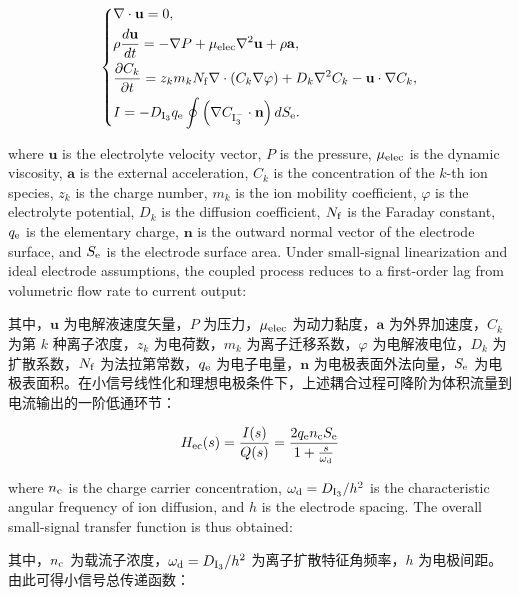 \documentclass[sn-nature]{sn-jnl}
\newif\ifCNENEnglish
\newif\ifCNENBilingual
\newcommand{\CNEN}[2]{%
    \ifCNENBilingual
        #1%
        \if\relax\detokenize{#2}\relax\else\par #2\fi%
    \else
        \ifCNENEnglish
            #2%
        \else
            #1%
        \fi
    \fi
}
\begin{document}
\begin{equation}
    \left\{
    \begin{aligned}
         & \nabla \cdot \mathbf{u} = 0, \\
         & \rho \frac{d\mathbf{u}}{dt} = -\nabla P + \mu_{\rm elec}\nabla^2\mathbf{u} + \rho \mathbf{a}, \\
         & \frac{\partial C_k}{\partial t} =
         z_k m_k N_{\rm f} \nabla \cdot \left(C_k \nabla \varphi\right)
         + D_k \nabla^2 C_k - \mathbf{u}\cdot\nabla C_k, \\
         & I = -D_{\mathrm{I}_3} q_{\rm e} \oint
         \left(\nabla C_{\mathrm{I}_3^-}\cdot\mathbf{n}\right)dS_{\rm e}.
    \end{aligned}
    \label{eq:small_signal_transport}
    \right.
\end{equation}

\CNEN{其中，$\mathbf{u}$ 为电解液速度矢量，$P$ 为压力，$\mu_{\rm elec}$ 为动力黏度，$\mathbf{a}$ 为外界加速度，$C_k$ 为第 $k$ 种离子浓度，$z_k$ 为电荷数，$m_k$ 为离子迁移系数，$\varphi$ 为电解液电位，$D_k$ 为扩散系数，$N_{\rm f}$ 为法拉第常数，$q_{\rm e}$ 为电子电量，$\mathbf{n}$ 为电极表面外法向量，$S_{\rm e}$ 为电极表面积。在小信号线性化和理想电极条件下，上述耦合过程可降阶为体积流量到电流输出的一阶低通环节：}{where $\mathbf{u}$ is the electrolyte velocity vector, $P$ is the pressure, $\mu_{\rm elec}$ is the dynamic viscosity, $\mathbf{a}$ is the external acceleration, $C_k$ is the concentration of the $k$-th ion species, $z_k$ is the charge number, $m_k$ is the ion mobility coefficient, $\varphi$ is the electrolyte potential, $D_k$ is the diffusion coefficient, $N_{\rm f}$ is the Faraday constant, $q_{\rm e}$ is the elementary charge, $\mathbf{n}$ is the outward normal vector of the electrode surface, and $S_{\rm e}$ is the electrode surface area. Under small-signal linearization and ideal electrode assumptions, the coupled process reduces to a first-order lag from volumetric flow rate to current output:%
}

\begin{equation}
    H_{\rm ec}(s) = \frac{I(s)}{Q(s)} = \frac{2 q_{\rm e} n_{\rm c} S_{\rm e}}{1 + \frac{s}{\omega_{\rm d}}}
    \label{fun:h_ec_transfer}
\end{equation}

\CNEN{其中，$n_{\rm c}$ 为载流子浓度，$\omega_{\rm d}=D_{\mathrm{I}_3}/h^2$ 为离子扩散特征角频率，$h$ 为电极间距。由此可得小信号总传递函数：}{where $n_{\rm c}$ is the charge carrier concentration, $\omega_{\rm d}=D_{\mathrm{I}_3}/h^2$ is the characteristic angular frequency of ion diffusion, and $h$ is the electrode spacing. The overall small-signal transfer function is thus obtained:%
}
\end{document}

